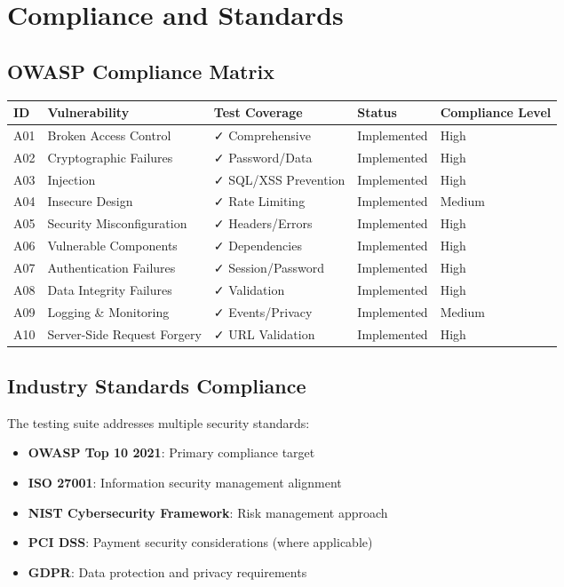 \documentclass[12pt]{article}
\begin{document}
\section{Compliance and Standards}

\subsection{OWASP Compliance Matrix}

\begin{longtable}{|p{1cm}|p{3cm}|p{3cm}|p{3cm}|p{3cm}|}
\hline
\textbf{ID} & \textbf{Vulnerability} & \textbf{Test Coverage} & \textbf{Status} & \textbf{Compliance Level} \\
\hline
A01 & Broken Access Control & ✓ Comprehensive & Implemented & High \\
\hline
A02 & Cryptographic Failures & ✓ Password/Data & Implemented & High \\
\hline
A03 & Injection & ✓ SQL/XSS Prevention & Implemented & High \\
\hline
A04 & Insecure Design & ✓ Rate Limiting & Implemented & Medium \\
\hline
A05 & Security Misconfiguration & ✓ Headers/Errors & Implemented & High \\
\hline
A06 & Vulnerable Components & ✓ Dependencies & Implemented & High \\
\hline
A07 & Authentication Failures & ✓ Session/Password & Implemented & High \\
\hline
A08 & Data Integrity Failures & ✓ Validation & Implemented & High \\
\hline
A09 & Logging \& Monitoring & ✓ Events/Privacy & Implemented & Medium \\
\hline
A10 & Server-Side Request Forgery & ✓ URL Validation & Implemented & High \\
\hline
\end{longtable}

\subsection{Industry Standards Compliance}

The testing suite addresses multiple security standards:

\begin{itemize}
    \item \textbf{OWASP Top 10 2021}: Primary compliance target
    \item \textbf{ISO 27001}: Information security management alignment
    \item \textbf{NIST Cybersecurity Framework}: Risk management approach
    \item \textbf{PCI DSS}: Payment security considerations (where applicable)
    \item \textbf{GDPR}: Data protection and privacy requirements
\end{itemize}
\end{document}
